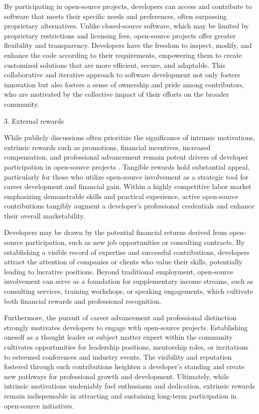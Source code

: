 By participating in open-source projects, developers can access and contribute to software that meets their specific needs and preferences, often surpassing proprietary alternatives. Unlike closed-source software, which may be limited by proprietary restrictions and licensing fees, open-source projects offer greater flexibility and transparency. Developers have the freedom to inspect, modify, and enhance the code according to their requirements, empowering them to create customized solutions that are more efficient, secure, and adaptable. This collaborative and iterative approach to software development not only fosters innovation but also fosters a sense of ownership and pride among contributors, who are motivated by the collective impact of their efforts on the broader community.

3. External rewards

While publicly discussions often prioritize the significance of intrinsic motivations, extrinsic rewards such as promotions, financial incentives, increased compensation, and professional advancement remain potent drivers of developer participation in open-source projects \cite{05bitzer2007intrinsic,06ye2003toward,07zhao2024openrank,11gerosa2021shifting,13li2012leadership,15roberts2006understanding,17alexander2002working,18oreg2008exploring}. Tangible rewards hold substantial appeal, particularly for those who utilize open-source involvement as a strategic tool for career development and financial gain. Within a highly competitive labor market emphasizing demonstrable skills and practical experience, active open-source contributions tangibly augment a developer's professional credentials and enhance their overall marketability.

Developers may be drawn by the potential financial returns derived from open-source participation, such as new job opportunities or consulting contracts. By establishing a visible record of expertise and successful contributions, developers attract the attention of companies or clients who value their skills, potentially leading to lucrative positions. Beyond traditional employment, open-source involvement can serve as a foundation for supplementary income streams, such as consulting services, training workshops, or speaking engagements, which cultivate both financial rewards and professional recognition.

Furthermore, the pursuit of career advancement and professional distinction strongly motivates developers to engage with open-source projects. Establishing oneself as a thought leader or subject matter expert within the community cultivates opportunities for leadership positions, mentorship roles, or invitations to esteemed conferences and industry events.  The visibility and reputation fostered through such contributions heighten a developer's standing and create new pathways for professional growth and development.  Ultimately, while intrinsic motivations undeniably fuel enthusiasm and dedication,  extrinsic rewards remain indispensable in attracting and sustaining long-term participation in open-source initiatives.

